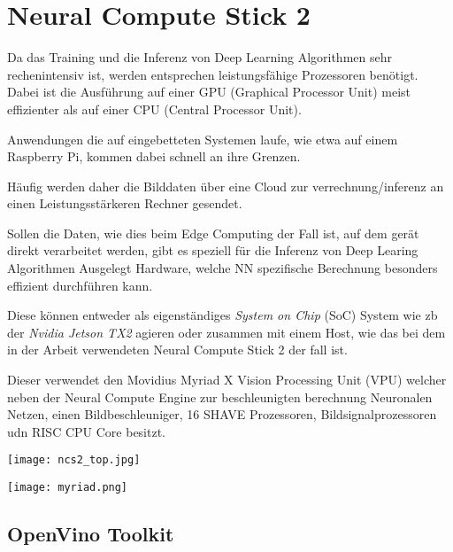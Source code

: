\section{Neural Compute Stick 2}\label{ncs2}

Da das Training und die Inferenz von Deep Learning Algorithmen
sehr rechenintensiv ist, werden entsprechen leistungsfähige 
Prozessoren benötigt. Dabei ist die Ausführung auf einer GPU 
(Graphical Processor Unit) meist effizienter als auf einer 
CPU (Central Processor Unit).

Anwendungen die auf eingebetteten Systemen laufe, wie etwa 
auf einem Raspberry Pi, kommen dabei schnell an ihre 
Grenzen.

Häufig werden daher die Bilddaten über eine Cloud zur 
verrechnung/inferenz an einen Leistungsstärkeren 
Rechner gesendet.

Sollen die Daten, wie dies beim Edge Computing der Fall ist, 
auf dem gerät direkt verarbeitet werden, gibt es speziell 
für die Inferenz von Deep Learing Algorithmen Ausgelegt 
Hardware, welche NN spezifische Berechnung besonders 
effizient durchführen kann.

Diese können entweder als eigenständiges \textit{System on Chip}
(SoC) System wie zb der \textit{Nvidia Jetson TX2} agieren oder 
zusammen mit einem Host, wie das bei dem in der Arbeit verwendeten 
Neural Compute Stick 2 der fall ist.

Dieser verwendet den Movidius Myriad X Vision Processing Unit (VPU)
welcher neben der Neural Compute Engine zur beschleunigten berechnung 
Neuronalen Netzen, einen Bildbeschleuniger, 16 SHAVE Prozessoren, 
Bildsignalprozessoren udn RISC CPU Core besitzt.
\cite{haussermannFunktionUndEffizienz}
\\[1cm]
\begin{minipage}{0.4\textwidth}
    \centering
    \label{fig:ncs2}
    \texttt{[image: ncs2\_top.jpg]}
\end{minipage}
\begin{minipage}{0.6\textwidth}
    \centering
    \label{fig:myriad}
    \texttt{[image: myriad.png]}
\end{minipage}


\subsection{OpenVino Toolkit}



